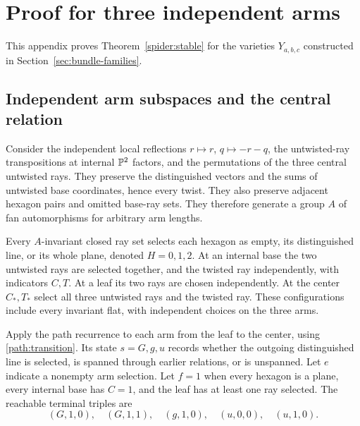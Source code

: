 \section{Proof for three independent arms}\label{sec:spiders}

This appendix proves Theorem~\ref{spider:stable} for the varieties $Y_{a,b,c}$
constructed in Section~\ref{sec:bundle-families}.

\subsection{Independent arm subspaces and the central relation}

Consider the independent local reflections $r\mapsto r$,
$q\mapsto-r-q$, the untwisted-ray transpositions at internal $\mathbb{P}^2$
factors, and the permutations of the three central untwisted rays.
They preserve the distinguished vectors and the sums of untwisted
base coordinates, hence every twist. They also preserve adjacent
hexagon pairs and omitted base-ray sets. They therefore generate a
group $A$ of fan automorphisms for arbitrary arm lengths.

Every $A$-invariant closed ray set selects each hexagon as empty, its
distinguished line, or its whole plane, denoted $H=0,1,2$. At an
internal base the two untwisted rays are selected together, and the
twisted ray independently, with indicators $C,T$. At a leaf its two
rays are chosen independently. At the center $C_*,T_*$ select all
three untwisted rays and the twisted ray. These configurations include
every invariant flat, with independent choices on the three arms.

Apply the path recurrence to each arm from the leaf to the center, using
\eqref{path:transition}. Its state $s=G,g,u$ records whether the
outgoing distinguished line is selected, is spanned through earlier
relations, or is unspanned. Let $e$ indicate a nonempty arm selection.
Let $f=1$ when every hexagon is a plane, every internal base has $C=1$,
and the leaf has at least one ray selected. The reachable terminal
triples are
\[
 (G,1,0),\quad(G,1,1),\quad(g,1,0),\quad(u,0,0),\quad(u,1,0).
\]

